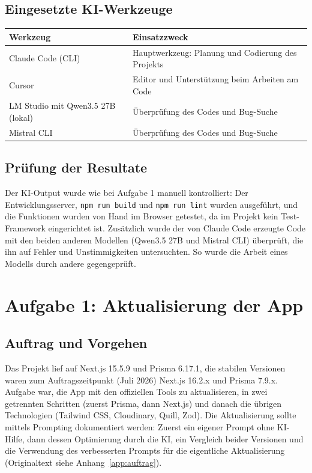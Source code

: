 \documentclass[11pt,a4paper]{article}
\let\oldsubsection\subsection
\renewcommand{\subsection}{\needspace{6\baselineskip}\oldsubsection}
\begin{document}
\subsection{Eingesetzte KI-Werkzeuge}
\begin{center}
\begin{tabularx}{\textwidth}{l X}
\toprule
\textbf{Werkzeug} & \textbf{Einsatzzweck} \\
\midrule
Claude Code (CLI) & Hauptwerkzeug: Planung und Codierung des Projekts \\
Cursor & Editor und Unterstützung beim Arbeiten am Code \\
LM Studio mit Qwen3.5 27B (lokal) & Überprüfung des Codes und Bug-Suche \\
Mistral CLI & Überprüfung des Codes und Bug-Suche \\
\bottomrule
\end{tabularx}
\end{center}

\subsection{Prüfung der Resultate}
Der KI-Output wurde wie bei Aufgabe 1 manuell kontrolliert: Der Entwicklungsserver, \texttt{npm run build} und \texttt{npm run lint} wurden ausgeführt, und die Funktionen wurden von Hand im Browser getestet, da im Projekt kein Test-Framework eingerichtet ist. Zusätzlich wurde der von Claude Code erzeugte Code mit den beiden anderen Modellen (Qwen3.5 27B und Mistral CLI) überprüft, die ihn auf Fehler und Unstimmigkeiten untersuchten. So wurde die Arbeit eines Modells durch andere gegengeprüft.

\section{Aufgabe 1: Aktualisierung der App}

\subsection{Auftrag und Vorgehen}
Das Projekt lief auf Next.js 15.5.9 und Prisma 6.17.1, die stabilen Versionen waren zum Auftragszeitpunkt (Juli 2026) Next.js 16.2.x und Prisma 7.9.x. Aufgabe war, die App mit den offiziellen Tools zu aktualisieren, in zwei getrennten Schritten (zuerst Prisma, dann Next.js) und danach die übrigen Technologien (Tailwind CSS, Cloudinary, Quill, Zod). Die Aktualisierung sollte mittels Prompting dokumentiert werden: Zuerst ein eigener Prompt ohne KI-Hilfe, dann dessen Optimierung durch die KI, ein Vergleich beider Versionen und die Verwendung des verbesserten Prompts für die eigentliche Aktualisierung (Originaltext siehe Anhang~\ref{app:auftrag}).
\end{document}
